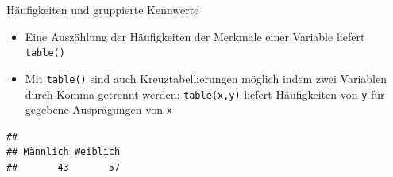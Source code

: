 \documentclass[ignorenonframetext,]{beamer}
\newenvironment{Shaded}{}{}
\newcommand{\KeywordTok}[1]{\textcolor[rgb]{0.00,0.44,0.13}{\textbf{{#1}}}}
\newcommand{\NormalTok}[1]{{#1}}
\providecommand{\tightlist}{%
\setlength{\itemsep}{0pt}\setlength{\parskip}{0pt}}
\begin{document}
\begin{frame}[fragile]{Häufigkeiten und gruppierte Kennwerte}

\begin{itemize}
\tightlist
\item
  Eine Auszählung der Häufigkeiten der Merkmale einer Variable liefert
  \texttt{table()}
\item
  Mit \texttt{table()} sind auch Kreuztabellierungen möglich indem zwei
  Variablen durch Komma getrennt werden: \texttt{table(x,y)} liefert
  Häufigkeiten von \texttt{y} für gegebene Ausprägungen von \texttt{x}
\end{itemize}

\begin{Shaded}
\end{Shaded}

\begin{verbatim}
## 
## Männlich Weiblich 
##       43       57
\end{verbatim}

\end{frame}
\end{document}
